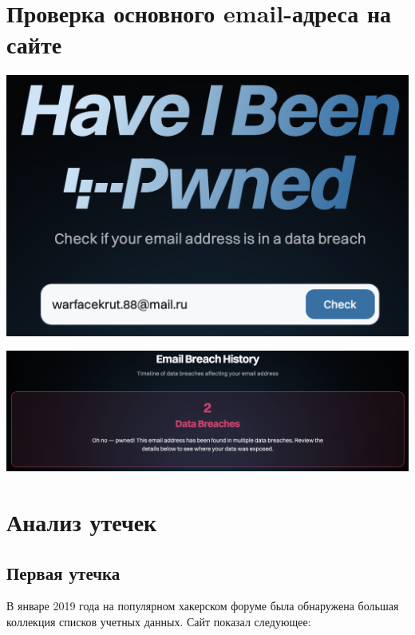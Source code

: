 \documentclass{article}
\begin{document}
\section{Проверка основного email-адреса на сайте}

\begin{center}
    \includegraphics[width=.9\textwidth]{1}
\end{center}
\begin{center}
    \includegraphics[width=.9\textwidth]{2}
\end{center}

\section{Анализ утечек}

\subsection{Первая утечка}

В январе 2019 года на популярном хакерском форуме была обнаружена большая коллекция списков учетных данных. Сайт показал следующее:
\end{document}
